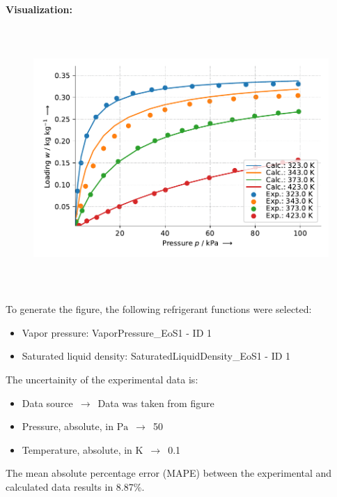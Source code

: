 \textbf{Visualization:}
%
\begin{figure}[!htp]
{\noindent\includegraphics[height=10cm, keepaspectratio]{figs/ads/ads_Propylene_mof_powder_cubtc_DualSiteSips_1.pdf}}
\end{figure}
%

To generate the figure, the following refrigerant functions were selected:
\begin{itemize}
\item Vapor pressure: VaporPressure\_EoS1 - ID 1
\item Saturated liquid density: SaturatedLiquidDensity\_EoS1 - ID 1
\end{itemize}

The uncertainity of the experimental data is:
\begin{itemize}
\item Data source $\,\to\,$ Data was taken from figure
\item Pressure, absolute, in $\si{\pascal}$ $\,\to\,$ 50
\item Temperature, absolute, in $\si{\kelvin}$ $\,\to\,$ 0.1
\end{itemize}

The mean absolute percentage error (MAPE) between the experimental and calculated data results in 8.87\%.
\FloatBarrier
\newpage
